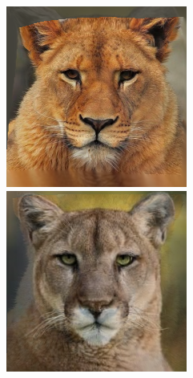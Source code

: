 \documentclass[conference]{IEEEtran}
\begin{document}
\begin{figure}[H]
\begin{multicols}{3}
    \includegraphics[width=1.0\linewidth]{results/cats/G/img10.png} \par
    \includegraphics[width=1.0\linewidth]{results/cats/G/img40.png} \par


\end{multicols}
\end{figure}
\end{document}

